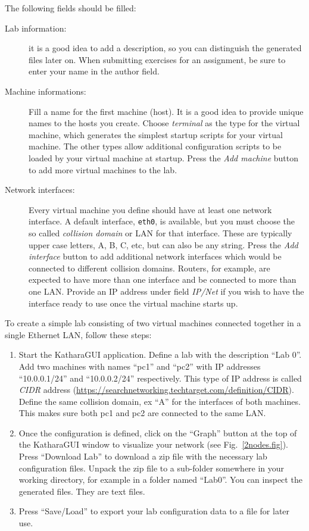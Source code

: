 \documentclass[12pt]{book}
\begin{document}
The following fields should be filled:
\begin{description}
\item[Lab information:] it is a good idea to add a description, so you
  can distinguish the generated files later on. When submitting
  exercises for an assignment, be sure to enter your name in the
  author field.
\item[Machine informations:] Fill a name for the first machine
  (host). It is a good idea to provide unique names to the hosts you
  create. Choose \emph{terminal} as the type for the virtual
  machine, which generates the simplest startup scripts for your
  virtual machine. The other types allow additional configuration
  scripts to be loaded by your virtual machine at startup. Press the
  \emph{Add machine} button to add more virtual machines to the lab. 
\item[Network interfaces:] Every virtual machine you define should
  have at least one network interface. A default interface,
  \verb$eth0$, is available, but you must choose the so called
  \emph{collision domain} or LAN for that interface. These are
  typically upper case letters, A, B, C, etc, but can also be any
  string. Press the \emph{Add interface} button to add additional
  network interfaces which would be connected to different collision
  domains. Routers, for example, are expected to have more than one
  interface and be connected to more than one LAN.  Provide an IP
  address under field \emph{IP/Net} if you wish to have the interface
  ready to use once the virtual machine starts up.
\end{description}

\smallskip
To create a simple lab consisting of two virtual machines connected together
in a single Ethernet LAN, follow these steps:

\begin{enumerate}[(1)]
\item Start the KatharaGUI application. Define a lab with the
  description ``Lab 0''. Add two machines with names ``pc1'' and
  ``pc2'' with IP addresses ``10.0.0.1/24'' and ``10.0.0.2/24''
  respectively. This type of IP address is called \emph{CIDR} address
  (\url{https://searchnetworking.techtarget.com/definition/CIDR}). 
  Define the same collision domain, ex ``A'' for the interfaces of
  both machines. This makes sure both pc1 and pc2 are connected to the
  same LAN. 

\item Once the configuration is defined, click on the ``Graph'' button
  at the top of the KatharaGUI window to visualize your network (see
  Fig.~\ref*{2nodes.fig}). Press
  ``Download Lab'' to download a zip file with the necessary lab
  configuration files. Unpack the zip file to a sub-folder somewhere
  in your working directory, for example in a folder named
  ``Lab0''. You can inspect the generated files. They are text files.

\item Press ``Save/Load'' to export your lab configuration data to a
  file for later use.
\end{enumerate}
\end{document}
